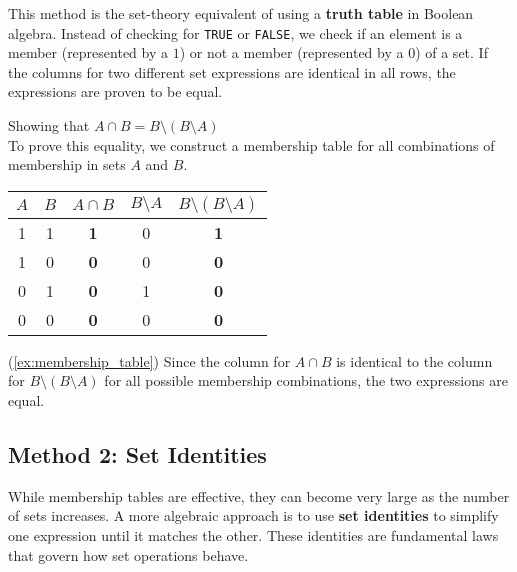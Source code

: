 This method is the set-theory equivalent of using a \textbf{truth table} in Boolean algebra. Instead of checking for \texttt{TRUE} or \texttt{FALSE}, we check if an element is a member (represented by a $1$) or not a member (represented by a $0$) of a set. If the columns for two different set expressions are identical in all rows, the expressions are proven to be equal.

\begin{example}{Showing that $A \cap B = B \setminus (B \setminus A)$}\\
    To prove this equality, we construct a membership table for all combinations of membership in sets $A$ and $B$.
    
    \begin{center}
    \renewcommand{\arraystretch}{1.5}
    \begin{tabular}{|c|c||c|c|c|}
        \hline
        $A$ & $B$ & $A \cap B$ & $B \setminus A$ & $B \setminus (B \setminus A)$ \\
        \hline
        1 & 1 & \textbf{1} & 0 & \textbf{1} \\
        1 & 0 & \textbf{0} & 0 & \textbf{0} \\
        0 & 1 & \textbf{0} & 1 & \textbf{0} \\
        0 & 0 & \textbf{0} & 0 & \textbf{0} \\
        \hline
    \end{tabular}
    \end{center}
    \label{ex:membership_table}

\begin{solution} (\autoref{ex:membership_table}) Since the column for $A \cap B$ is identical to the column for $B \setminus (B \setminus A)$ for all possible membership combinations, the two expressions are equal.
\end{solution}

\end{example}



\subsection*{Method 2: Set Identities}
While membership tables are effective, they can become very large as the number of sets increases. A more algebraic approach is to use \textbf{set identities} to simplify one expression until it matches the other. These identities are fundamental laws that govern how set operations behave.

